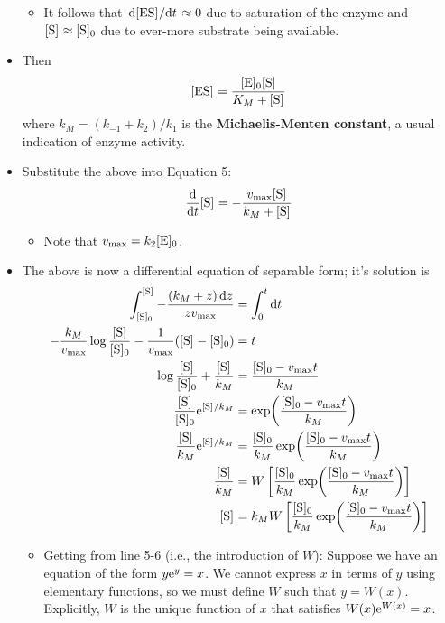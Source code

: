 \documentclass[../notes.tex]{subfiles}
\begin{document}
\begin{itemize}
\begin{itemize}
        \item It follows that $\dv*{\cnc{ES}}{t}\approx 0$ due to saturation of the enzyme and $\cnc{S}\approx\cnc[0]{S}$ due to ever-more substrate being available.
    \end{itemize}
    \item Then
    \begin{equation*}
        \cnc{ES} = \frac{\cnc[0]{E}\cnc{S}}{K_M+\cnc{S}}
    \end{equation*}
    where $k_M=(k_{-1}+k_2)/k_1$ is the \textbf{Michaelis-Menten constant}, a usual indication of enzyme activity.
    \item Substitute the above into Equation 5:
    \begin{equation*}
        \dv{t}\cnc{S} = -\frac{v_\text{max}\cnc{S}}{k_M+\cnc{S}}
    \end{equation*}
    \begin{itemize}
        \item Note that $v_\text{max}=k_2\cnc[0]{E}$.
    \end{itemize}
    \item The above is now a differential equation of separable form; it's solution is
    \begingroup
    \allowdisplaybreaks
    \begin{align*}
        \int_{\cnc[0]{S}}^{\cnc{S}}-\frac{(k_M+z)\dd{z}}{zv_\text{max}} &= \int_0^t\dd{t}\\
        -\frac{k_M}{v_\text{max}}\log\frac{\cnc{S}}{\cnc[0]{S}}-\frac{1}{v_\text{max}}(\cnc{S}-\cnc[0]{S}) &= t\\
        \log\frac{\cnc{S}}{\cnc[0]{S}}+\frac{\cnc{S}}{k_M} &= \frac{\cnc[0]{S}-v_\text{max}t}{k_M}\\
        \frac{\cnc{S}}{\cnc[0]{S}}\e[\cnc{S}/k_M] &= \exp(\frac{\cnc[0]{S}-v_\text{max}t}{k_M})\\
        \frac{\cnc{S}}{k_M}\e[\cnc{S}/k_M] &= \frac{\cnc[0]{S}}{k_M}\exp(\frac{\cnc[0]{S}-v_\text{max}t}{k_M})\\
        \frac{\cnc{S}}{k_M} &= W\left[ \frac{\cnc[0]{S}}{k_M}\exp(\frac{\cnc[0]{S}-v_\text{max}t}{k_M}) \right]\\
        \cnc{S} &= k_MW\left[ \frac{\cnc[0]{S}}{k_M}\exp(\frac{\cnc[0]{S}-v_\text{max}t}{k_M}) \right]
    \end{align*}
    \endgroup
    \begin{itemize}
        \item Getting from line 5-6 (i.e., the introduction of $W$): Suppose we have an equation of the form $y\e[y]=x$. We cannot express $x$ in terms of $y$ using elementary functions, so we must define $W$ such that $y=W(x)$. Explicitly, $W$ is the unique function of $x$ that satisfies $W(x)\e[W(x)]=x$.

\end{itemize}
\end{itemize}
\end{document}
